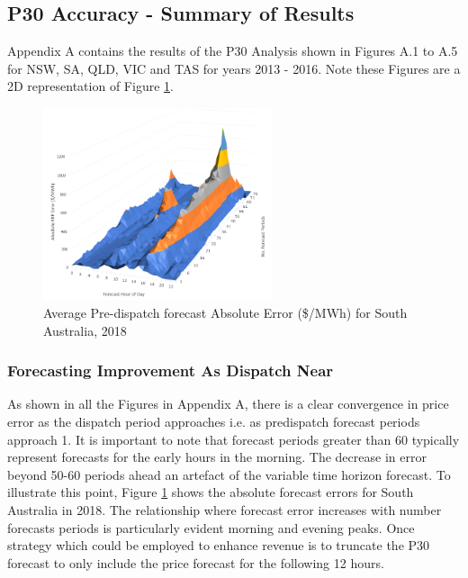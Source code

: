 \subsection{P30 Accuracy - Summary of Results}
Appendix A contains the results of the P30 Analysis shown in Figures A.1 to A.5 for NSW, SA, QLD, VIC and TAS for years 2013 - 2016. Note these Figures are a 2D representation of Figure \ref{fig:predispatch_surface}.
\begin{figure}
    \begin{center}
    \centering
    \includegraphics[width=0.6\textwidth]{Pictures/Chapter4/sa_forecast_error_2018.png}
    \end{center}
    \caption{Average Pre-dispatch forecast Absolute Error (\$/MWh) for South Australia, 2018}
    \label{fig:predispatch_surface}
\end{figure}
\subsubsection{Forecasting Improvement As Dispatch Near}
As shown in all the Figures in Appendix A, there is a clear convergence in price error as the dispatch period approaches i.e. as predispatch forecast periods approach 1. It is important to note that forecast periods greater than 60 typically represent forecasts for the early hours in the morning. The decrease in error beyond 50-60 periods ahead an artefact of the variable time horizon forecast. To illustrate this point, Figure \ref{fig:predispatch_surface} shows the absolute forecast errors for South Australia in 2018. The relationship where forecast error increases with number forecasts periods is particularly evident morning and evening peaks. Once strategy which could be employed to enhance revenue is to truncate the P30 forecast to only include the price forecast for the following 12 hours.
\newpage
